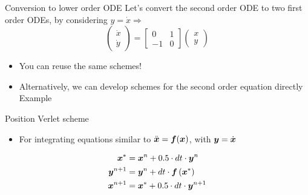 \documentclass[presentation]{beamer}
\newcommand{\gv}[1]{\ensuremath{\mbox{\boldmath$ #1 $}}}
\begin{document}
\begin{frame}[label={sec:org719ea4f}]{Conversion to lower order ODE}
Let's convert the second order ODE to two first order ODEs, by considering \(y = \dot{x} \Rightarrow\)
\[ \begin{pmatrix} \dot{x} \\ \dot{y} \end{pmatrix} = \begin{bmatrix} 0 & 1\\-1
   & 0 \end{bmatrix} \begin{pmatrix} {x} \\ {y} \end{pmatrix} \]

\begin{itemize}
\item You can reuse the same schemes!
\item Alternatively, we can develop schemes for the second order equation
directly \alert{Example}
\end{itemize}

\begin{block}{Position Verlet scheme}
\begin{itemize}
\item For integrating equations similar to \(\ddot{\gv{x}} = \gv{f}(\gv{x})\),
with \(\gv{y} = \dot{\gv{x}}\)
\end{itemize}
\begin{equation*}
\begin{aligned}
\gv{x}^* &= \gv{x}^n + 0.5\cdot dt \cdot \gv{y}^n \\
\gv{y}^{n+1} &= \gv{y}^n + dt \cdot \gv{f}\left( \gv{x}^*\right) \\
\gv{x}^{n+1} &= \gv{x}^* + 0.5\cdot dt \cdot \gv{y}^{n+1}
\end{aligned}
\end{equation*}
\end{block}
\end{frame}
\end{document}
